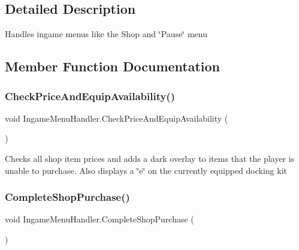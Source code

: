\subsection{Detailed Description}
Handles ingame menus like the Shop and \char`\"{}\+Pause\char`\"{} menu 



\subsection{Member Function Documentation}
\hypertarget{class_ingame_menu_handler_adc655857f2b8a36bd4271a0a7dc3f0d2}{}\label{class_ingame_menu_handler_adc655857f2b8a36bd4271a0a7dc3f0d2} 
\subsubsection{\texorpdfstring{Check\+Price\+And\+Equip\+Availability()}{CheckPriceAndEquipAvailability()}}
{\footnotesize\ttfamily void Ingame\+Menu\+Handler.\+Check\+Price\+And\+Equip\+Availability (\begin{DoxyParamCaption}{ }\end{DoxyParamCaption})}



Checks all shop item prices and adds a dark overlay to items that the player is unable to purchase. Also displays a \char`\"{}e\char`\"{} on the currently equipped docking kit 

\hypertarget{class_ingame_menu_handler_a421bf1a3b39bb441f2ab41d8262bda75}{}\label{class_ingame_menu_handler_a421bf1a3b39bb441f2ab41d8262bda75} 
\subsubsection{\texorpdfstring{Complete\+Shop\+Purchase()}{CompleteShopPurchase()}}
{\footnotesize\ttfamily void Ingame\+Menu\+Handler.\+Complete\+Shop\+Purchase (\begin{DoxyParamCaption}{ }\end{DoxyParamCaption})}



